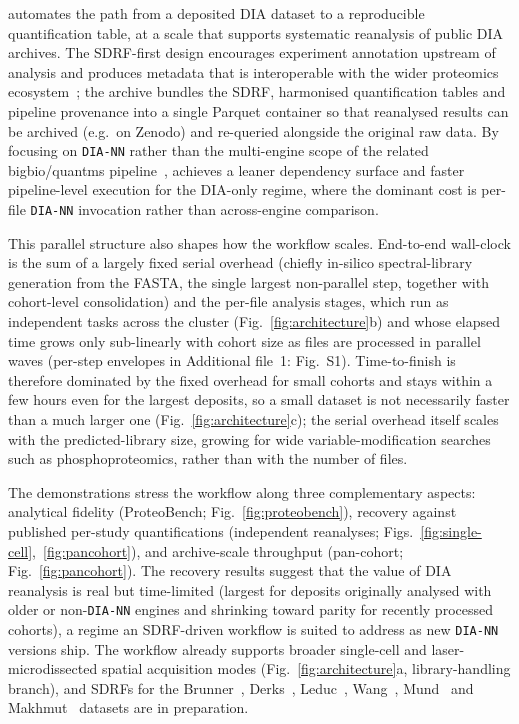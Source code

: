 \quantmsdiann{} automates the path from a deposited DIA dataset to a reproducible quantification table, at a scale that supports systematic reanalysis of public DIA archives.
The SDRF-first design encourages experiment annotation upstream of analysis and produces metadata that is interoperable with the wider proteomics ecosystem~\cite{dai2021sdrf}; the \qpx{} archive bundles the SDRF, harmonised quantification tables and pipeline provenance into a single Parquet container so that reanalysed results can be archived (e.g.\ on Zenodo) and re-queried alongside the original raw data.
By focusing on \texttt{DIA-NN} rather than the multi-engine scope of the related bigbio/quantms pipeline~\cite{dai2024quantms}, \quantmsdiann{} achieves a leaner dependency surface and faster pipeline-level execution for the DIA-only regime, where the dominant cost is per-file \texttt{DIA-NN} invocation rather than across-engine comparison.

This parallel structure also shapes how the workflow scales. End-to-end wall-clock is the sum of a largely fixed serial overhead (chiefly in-silico spectral-library generation from the FASTA, the single largest non-parallel step, together with cohort-level consolidation) and the per-file analysis stages, which run as independent tasks across the cluster (Fig.~\ref{fig:architecture}b) and whose elapsed time grows only sub-linearly with cohort size as files are processed in parallel waves (per-step envelopes in Additional file~1: Fig.~S1). Time-to-finish is therefore dominated by the fixed overhead for small cohorts and stays within a few hours even for the largest deposits, so a small dataset is not necessarily faster than a much larger one (Fig.~\ref{fig:architecture}c); the serial overhead itself scales with the predicted-library size, growing for wide variable-modification searches such as phosphoproteomics, rather than with the number of files.

The demonstrations stress the workflow along three complementary aspects: analytical fidelity (ProteoBench; Fig.~\ref{fig:proteobench}), recovery against published per-study quantifications (independent reanalyses; Figs.~\ref{fig:single-cell},~\ref{fig:pancohort}), and archive-scale throughput (pan-cohort; Fig.~\ref{fig:pancohort}).
The recovery results suggest that the value of DIA reanalysis is real but time-limited (largest for deposits originally analysed with older or non-\texttt{DIA-NN} engines and shrinking toward parity for recently processed cohorts), a regime an SDRF-driven workflow is suited to address as new \texttt{DIA-NN} versions ship.
The workflow already supports broader single-cell and laser-microdissected spatial acquisition modes (Fig.~\ref{fig:architecture}a, library-handling branch), and SDRFs for the Brunner~\cite{brunner2022}, Derks~\cite{derks2023}, Leduc~\cite{leduc2024}, Wang~\cite{wang2025}, Mund~\cite{mund2022} and Makhmut~\cite{makhmut2023} datasets are in preparation.

